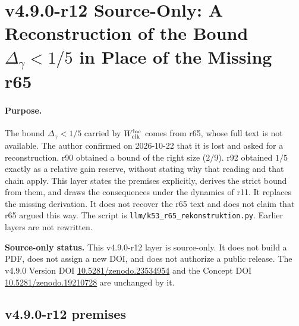 \clearpage
\section*{v4.9.0-r12 Source-Only: A Reconstruction of the Bound \texorpdfstring{\(\Delta_\gamma<1/5\)}{Delta gamma < 1/5} in Place of the Missing r65}
\label{sec:v490-r12-delta-gamma-reconstruction}

\paragraph{Purpose.}
The bound \(\Delta_\gamma<1/5\) carried by \(W_{\rm clk}^{\rm loc}\) comes from r65, whose full text is not available.  The
author confirmed on 2026-10-22 that it is lost and asked for a reconstruction.  r90 obtained a bound of the right size
(\(2/9\)).  r92 obtained \(1/5\) exactly as a relative gain reserve, without stating why that reading and that chain apply.
This layer states the premises explicitly, derives the strict bound from them, and draws the consequences under the
dynamics of r11.  It replaces the missing derivation.  It does not recover the r65 text and does not claim that r65 argued
this way.  The script is \texttt{llm/k53\_r65\_rekonstruktion.py}.  Earlier layers are not rewritten.

\noindent\textbf{Source-only status.}
This v4.9.0-r12 layer is source-only.  It does not build a PDF, does not assign a new DOI,
and does not authorize a public release.  The v4.9.0 Version DOI
\href{https://doi.org/10.5281/zenodo.23534954}{10.5281/zenodo.23534954} and the Concept DOI
\href{https://doi.org/10.5281/zenodo.19210728}{10.5281/zenodo.19210728} are unchanged by it.

\subsection*{v4.9.0-r12 premises}
\label{subsec:v490-r12-premises}

